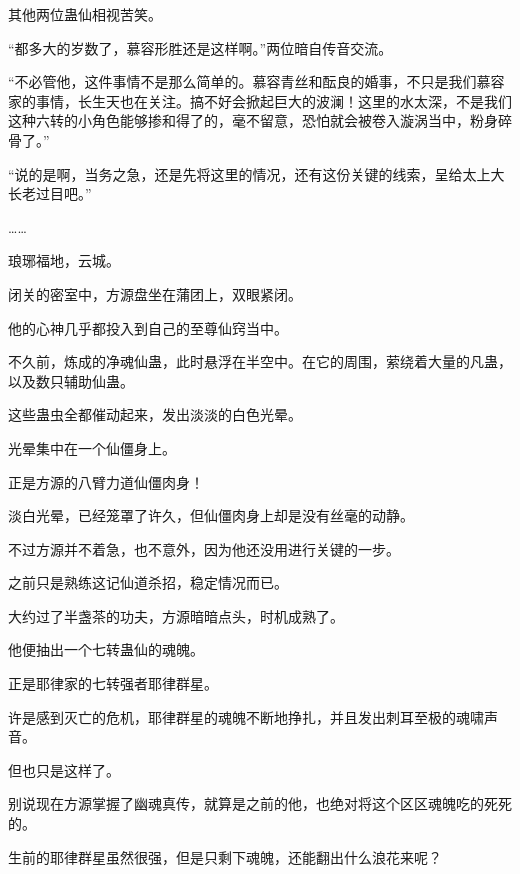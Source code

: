 \begin{this_body}
其他两位蛊仙相视苦笑。

“都多大的岁数了，慕容形胜还是这样啊。”两位暗自传音交流。

“不必管他，这件事情不是那么简单的。慕容青丝和酝良的婚事，不只是我们慕容家的事情，长生天也在关注。搞不好会掀起巨大的波澜！这里的水太深，不是我们这种六转的小角色能够掺和得了的，毫不留意，恐怕就会被卷入漩涡当中，粉身碎骨了。”

“说的是啊，当务之急，还是先将这里的情况，还有这份关键的线索，呈给太上大长老过目吧。”

……

琅琊福地，云城。

闭关的密室中，方源盘坐在蒲团上，双眼紧闭。

他的心神几乎都投入到自己的至尊仙窍当中。

不久前，炼成的净魂仙蛊，此时悬浮在半空中。在它的周围，萦绕着大量的凡蛊，以及数只辅助仙蛊。

这些蛊虫全都催动起来，发出淡淡的白色光晕。

光晕集中在一个仙僵身上。

正是方源的八臂力道仙僵肉身！

淡白光晕，已经笼罩了许久，但仙僵肉身上却是没有丝毫的动静。

不过方源并不着急，也不意外，因为他还没用进行关键的一步。

之前只是熟练这记仙道杀招，稳定情况而已。

大约过了半盏茶的功夫，方源暗暗点头，时机成熟了。

他便抽出一个七转蛊仙的魂魄。

正是耶律家的七转强者耶律群星。

许是感到灭亡的危机，耶律群星的魂魄不断地挣扎，并且发出刺耳至极的魂啸声音。

但也只是这样了。

别说现在方源掌握了幽魂真传，就算是之前的他，也绝对将这个区区魂魄吃的死死的。

生前的耶律群星虽然很强，但是只剩下魂魄，还能翻出什么浪花来呢？

\end{this_body}

